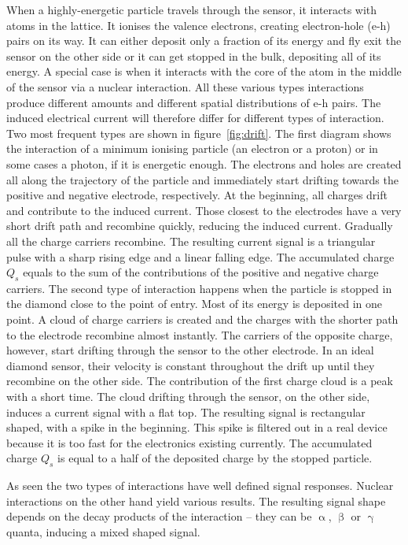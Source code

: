 \documentclass[12pt]{mytustyle}  %
\begin{document}
\begin{figure}[!t]
\end{figure}When a highly-energetic particle travels through the sensor, it interacts with atoms in the lattice. It ionises the valence electrons, creating electron-hole (e-h) pairs on its way. It can either deposit only a fraction of its energy and fly exit the sensor on the other side or it can get stopped in the bulk, depositing all of its energy. A special case is when it interacts with the core of the atom in the middle of the sensor via a nuclear interaction. All these various types interactions produce different amounts and different spatial distributions of e-h pairs. The induced electrical current will therefore differ for different types of interaction. Two most frequent types are shown in figure~\ref{fig:drift}. The first diagram shows the interaction of a minimum ionising particle (an electron or a proton) or in some cases a photon, if it is energetic enough. The electrons and holes are created all along the trajectory of the particle and immediately start drifting towards the positive and negative electrode, respectively. At the beginning, all charges drift and contribute to the induced current. Those closest to the electrodes have a very short drift path and recombine quickly, reducing the induced current. Gradually all the charge carriers recombine. The resulting current signal is a triangular pulse with a sharp rising edge and a linear falling edge. The accumulated charge $Q_s$ equals to the sum of the contributions of the positive and negative charge carriers. The second type of interaction happens when the particle is stopped in the diamond close to the point of entry. Most of its energy is deposited in one point. A cloud of charge carriers is created and the charges with the shorter path to the electrode recombine almost instantly. The carriers of the opposite charge, however, start drifting through the sensor to the other electrode. In an ideal diamond sensor, their velocity is constant throughout the drift up until they recombine on the other side. The contribution of the first charge cloud is a peak with a short time. The cloud drifting through the sensor, on the other side, induces a current signal with a flat top. The resulting signal is rectangular shaped, with a spike in the beginning. This spike is filtered out in a real device because it is too fast for the electronics existing currently. The accumulated charge $Q_s$ is equal to a half of the deposited charge by the stopped particle.

As seen the two types of interactions have well defined signal responses. Nuclear interactions on the other hand yield various results. The resulting signal shape depends on the decay products of the interaction -- they can be $\upalpha$, $\upbeta$ or $\upgamma$ quanta, inducing a mixed shaped signal. 
%
\end{document}
